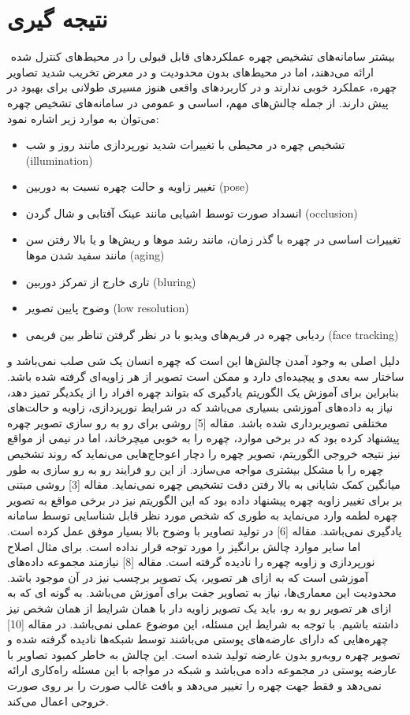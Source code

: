 \section{نتیجه گیری}‌
بیشتر سامانه‌های تشخیص چهره عملکردهای قابل قبولی را در محیط‌های کنترل شده ارائه می‌دهند، اما در محیط‌های بدون محدودیت و در معرض تخریب شدید تصاویر چهره، عملکرد خوبی ندارند و در کاربردهای واقعی هنوز مسیری طولانی برای بهبود در پیش دارند. از جمله چالش‌های مهم، اساسی و عمومی در سامانه‌های تشخیص چهره می‌توان به موارد زیر اشاره نمود:

\begin{itemize}
\item
تشخیص چهره در محیطی با تغییرات شدید نورپردازی مانند روز و شب (illumination)
 \item
تغییر زاویه و حالت چهره نسبت به دوربین (pose)
 \item
انسداد صورت توسط اشیایی مانند عینک آفتابی و شال گردن (occlusion)
 \item
تغییرات اساسی در چهره با گذر زمان، مانند رشد موها و ریش‌ها و یا بالا رفتن سن مانند سفید شدن موها (aging)
 \item
تاری خارج از تمرکز دوربین (bluring)
 \item
وضوح پایین تصویر (low resolution)
 \item
ردیابی چهره در فریم‌های ویدیو با در نظر گرفتن تناظر بین فریمی (face tracking)
\end{itemize} 
\noindent
دلیل اصلی به وجود آمدن چالش‌ها این است که چهره انسان یک شی صلب نمی‌باشد و ساختار سه بعدی و پیچیده‌ای دارد و ممکن است تصویر از هر زاویه‌ای گرفته شده باشد. بنابراین برای آموزش یک الگوریتم یادگیری که بتواند چهره افراد را از یکدیگر تمیز دهد، نیاز به داده‌های آموزشی بسیاری می‌باشد که در شرایط نورپردازی، زاویه و حالت‌های مختلفی تصویربرداری شده باشد.
\noindent
مقاله [5] روشی برای رو به رو سازی تصویر چهره پیشنهاد کرده بود که در برخی موارد، چهره را به خوبی میچرخاند، اما در نیمی از مواقع نیز نتیجه خروجی الگوریتم، تصویر چهره را دچار اعوجاج‌هایی می‌نماید که روند تشخیص چهره را با مشکل بیشتری مواجه می‌سازد. از این رو فرایند رو به رو سازی به طور میانگین کمک شایانی به بالا رفتن دقت تشخیص چهره نمی‌نماید.
\noindent
مقاله [3] روشی مبتنی بر  برای تغییر زاویه چهره پیشنهاد داده بود که این الگوریتم نیز در برخی مواقع به تصویر چهره لطمه وارد می‌نماید به طوری که شخص مورد نظر قابل شناسایی توسط سامانه یادگیری نمی‌باشد.
\noindent
مقاله [6] در تولید تصاویر با وضوح بالا بسیار موفق عمل کرده است. اما سایر موارد چالش برانگیز را مورد توجه قرار نداده است. برای مثال اصلاح نورپردازی و زاویه چهره را نادیده گرفته است.
\noindent
مقاله [8] نیازمند مجموعه داده‌های آموزشی است که به ازای هر تصویر، یک تصویر برچسب نیز در آن موجود باشد. محدودیت این معماری‌ها، نیاز به تصاویر جفت برای آموزش می‌باشد. به گونه ای که به ازای هر تصویر رو به رو، باید یک تصویر زاویه دار با همان شرایط از همان شخص نیز داشته باشیم. با توجه به شرایط این مسئله، این موضوع عملی نمی‌باشد.
\noindent
در مقاله [10] چهره‌هایی که دارای عارضه‌های پوستی می‌باشند توسط شبکه‌ها نادیده گرفته شده و تصویر چهره روبه‌رو بدون عارضه تولید شده است. این چالش به خاطر کمبود تصاویر با عارضه پوستی در مجموعه داده می‌باشد و شبکه در مواجه با این مسئله راه‌کاری ارائه نمی‌دهد و فقط جهت چهره را تغییر می‌دهد و بافت غالب صورت را بر روی صورت خروجی اعمال می‌کند.
